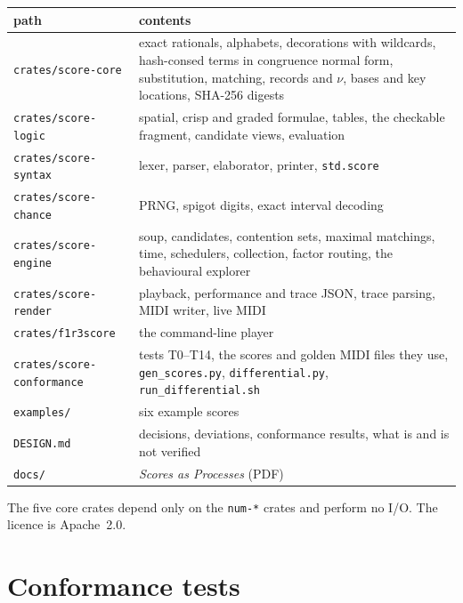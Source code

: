 \documentclass[11pt,a4paper]{article}
\newcommand{\ttx}[1]{\texttt{#1}}
\begin{document}
\begin{center}
\small
\begin{tabularx}{\linewidth}{@{}l>{\raggedright\arraybackslash}X@{}}
\toprule
path & contents \\
\midrule
\ttx{crates/score-core} & exact rationals, alphabets, decorations with
  wildcards, hash-consed terms in congruence normal form, substitution,
  matching, records and $\nu$, bases and key locations, SHA-256 digests \\
\ttx{crates/score-logic} & spatial, crisp and graded formulae, tables, the
  checkable fragment, candidate views, evaluation \\
\ttx{crates/score-syntax} & lexer, parser, elaborator, printer, \ttx{std.score} \\
\ttx{crates/score-chance} & PRNG, spigot digits, exact interval decoding \\
\ttx{crates/score-engine} & soup, candidates, contention sets, maximal
  matchings, time, schedulers, collection, factor routing, the behavioural
  explorer \\
\ttx{crates/score-render} & playback, performance and trace JSON, trace
  parsing, MIDI writer, live MIDI \\
\ttx{crates/f1r3score} & the command-line player \\
\ttx{crates/score-conformance} & tests T0--T14, the scores and golden MIDI
  files they use, \ttx{gen\_scores.py}, \ttx{differential.py},
  \ttx{run\_differential.sh} \\
\ttx{examples/} & six example scores \\
\ttx{DESIGN.md} & decisions, deviations, conformance results, what is and is
  not verified \\
\ttx{docs/} & \emph{Scores as Processes} (PDF) \\
\bottomrule
\end{tabularx}
\end{center}

\noindent The five core crates depend only on the \ttx{num-*} crates and
perform no I/O. The licence is Apache~2.0.

\section{Conformance tests}
\end{document}
